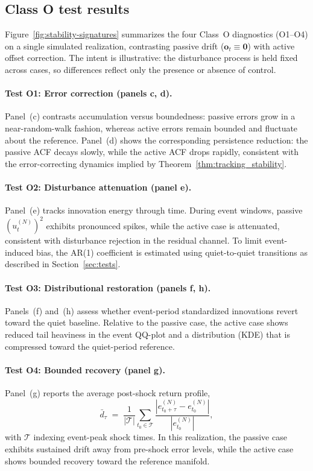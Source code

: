 \documentclass{article}
\begin{document}
\subsection{Class O test results}

Figure~\ref{fig:stability-signatures} summarizes the four Class~O diagnostics (O1--O4) on a single simulated realization, contrasting passive drift ($\mathbf{o}_t\equiv\mathbf{0}$) with active offset correction. The intent is illustrative: the disturbance process is held fixed across cases, so differences reflect only the presence or absence of control.



\paragraph{Test O1: Error correction (panels c, d).}
Panel~(c) contrasts accumulation versus boundedness: passive errors grow in a near-random-walk fashion, whereas active errors remain bounded and fluctuate about the reference. Panel~(d) shows the corresponding persistence reduction: the passive ACF decays slowly, while the active ACF drops rapidly, consistent with the error-correcting dynamics implied by Theorem~\ref{thm:tracking_stability}.

\paragraph{Test O2: Disturbance attenuation (panel e).}
Panel~(e) tracks innovation energy through time. During event windows, passive $(u_t^{(N)})^2$ exhibits pronounced spikes, while the active case is attenuated, consistent with disturbance rejection in the residual channel. To limit event-induced bias, the AR(1) coefficient is estimated using quiet-to-quiet transitions as described in Section~\ref{sec:tests}.

\paragraph{Test O3: Distributional restoration (panels f, h).}
Panels~(f) and~(h) assess whether event-period standardized innovations revert toward the quiet baseline. Relative to the passive case, the active case shows reduced tail heaviness in the event QQ-plot and a distribution (KDE) that is compressed toward the quiet-period reference.

\paragraph{Test O4: Bounded recovery (panel g).}
Panel~(g) reports the average post-shock return profile,
\[
\bar{d}_\tau \;=\; \frac{1}{|\mathcal{T}|}\sum_{t_0 \in \mathcal{T}}
\frac{|e_{t_0+\tau}^{(N)} - e_{t_0}^{(N)}|}{|e_{t_0}^{(N)}|},
\]
with $\mathcal{T}$ indexing event-peak shock times. In this realization, the passive case exhibits sustained drift away from pre-shock error levels, while the active case shows bounded recovery toward the reference manifold.
\end{document}
